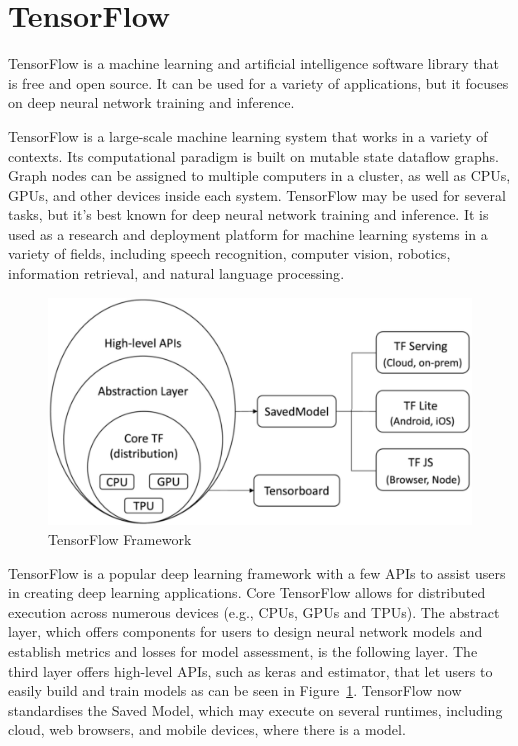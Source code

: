 \documentclass[12pt,letterpaper]{report}
\begin{document}
\section{TensorFlow} \label{sec:tensorflow}
TensorFlow is a machine learning and artificial intelligence software library that is free and open source. It can be used for a variety of applications, but it focuses on deep neural network training and inference.

TensorFlow is a large-scale machine learning system that works in a variety of contexts. Its computational paradigm is built on mutable state dataflow graphs. Graph nodes can be assigned to multiple computers in a cluster, as well as CPUs, GPUs, and other devices inside each system. TensorFlow may be used for several tasks, but it's best known for deep neural network training and inference. It is used as a research and deployment platform for machine learning systems in a variety of fields, including speech recognition, computer vision, robotics, information retrieval, and natural language processing\cite{tensorflowScale}.

\begin{figure}[h]
    \begin{center}
    \includegraphics[width=0.5\linewidth]{comp6961-report-framework.png}
    \end{center}
       \caption{TensorFlow Framework\cite{apiEvo}\label{framework}}
\end{figure}

TensorFlow is a popular deep learning framework with a few APIs to assist users in creating deep learning applications. Core TensorFlow allows for distributed execution across numerous devices (e.g., CPUs, GPUs and TPUs). The abstract layer, which offers components for users to design neural network models and establish metrics and losses for model assessment, is the following layer. The third layer offers high-level APIs, such as keras and estimator, that let users to easily build and train models as can be seen in Figure~\ref{framework}. TensorFlow now standardises the Saved Model, which may execute on several runtimes, including cloud, web browsers, and mobile devices, where there is a model.
\end{document}
